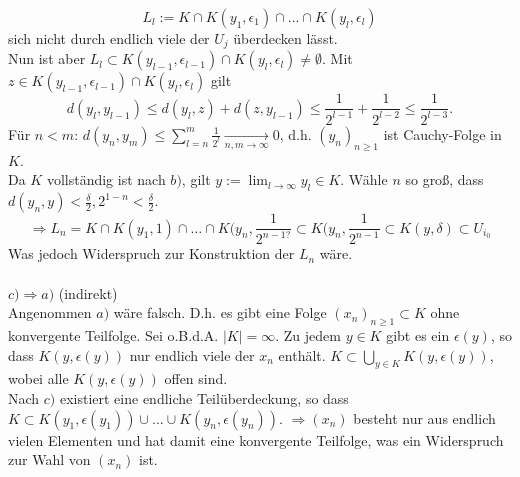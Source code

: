 \begin{beweis}
	\[ L_{l} := K \cap K(y_{1}, \epsilon_{1}) \cap \dotsc \cap K(y_{l}, \epsilon_{l}) \]
	sich nicht durch endlich viele der $U_{j}$ überdecken lässt. \\
	Nun ist aber $L_{l} \subset K(y_{l - 1}, \epsilon_{l - 1}) \cap K(y_{l}, \epsilon_{l}) \neq \emptyset$. Mit $z \in K(y_{l - 1}, \epsilon_{l - 1}) \cap K(y_{l}, \epsilon_{l})$ gilt
	\[ d(y_{l}, y_{l - 1}) \leq d(y_{l}, z) + d(z, y_{l - 1}) \leq \frac{1}{2^{l - 1}} + \frac{1}{2^{l - 2}} \leq \frac{1}{2^{l - 3}}. \]
	Für $n < m$: $d(y_{n}, y_{m}) \leq \sum_{l = n}^{m} \frac{1}{2^{l}} \xrightarrow[n, m \rightarrow \infty]{} 0$, d.h. $(y_{n})_{n \geq 1}$ ist Cauchy-Folge in $K$. \\
	Da $K$ vollständig ist nach $b)$, gilt $y := \lim_{l \rightarrow \infty} y_{l} \in K$.
	Wähle $n$ so gro{\ss}, dass $d(y_{n}, y) < \frac{\delta}{2}, 2^{1-n} < \frac{\delta}{2}$. \\
	\[ \Rightarrow L_{n} = K \cap K(y_{1}, 1) \cap \dotsc \cap K(y_{n}, \frac{1}{2^{n - 1 ?}} \subset K(y_{n}, 	\frac{1}{2^{n - 1}} \subset K(y, \delta) \subset U_{i_{0}} \]
	Was jedoch Widerspruch zur Konstruktion der $L_{n}$ wäre. \\ \\
	$c) \Rightarrow a)$ (indirekt) \\
	Angenommen $a)$ wäre falsch. D.h. es gibt eine Folge $(x_{n})_{n \geq 1} \subset K$ ohne konvergente Teilfolge. Sei o.B.d.A. $|K| = \infty$. Zu jedem $y \in K$ gibt es ein $	\epsilon(y)$, so dass $K(y, \epsilon(y))$ nur endlich viele der $x_{n}$ enthält. $K \subset \bigcup_{y \in K} K(y, \epsilon(y))$, wobei alle $K(y, \epsilon(y))$ offen sind. \\
	Nach $c)$ existiert eine endliche Teilüberdeckung, so dass $K \subset K(y_{1}, \epsilon(y_{1})) \cup \dotsc \cup K(y_{n}, \epsilon(y_{n}))$.
	$\Rightarrow (x_{n})$ besteht nur aus endlich vielen Elementen und hat damit eine konvergente Teilfolge, was ein Widerspruch zur Wahl von $(x_{n})$ ist.
\end{beweis}

